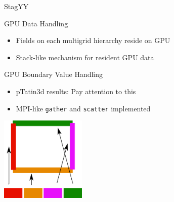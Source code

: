 \begin{frame}{StagYY}

  \begin{block}{GPU Data Handling}
  \begin{itemize}
   \item Fields on each multigrid hierarchy reside on GPU
   \item Stack-like mechanism for resident GPU data
  \end{itemize}
  \end{block}

  \begin{block}{GPU Boundary Value Handling}
  \begin{itemize}
   \item pTatin3d results: Pay attention to this
   \item MPI-like \texttt{gather} and \texttt{scatter} implemented
  \end{itemize}
  \end{block}

\begin{flushright}
  \vspace*{-4cm} \includegraphics[width=0.305\textwidth]{figures/scatter}
\end{flushright}
  
\end{frame}






